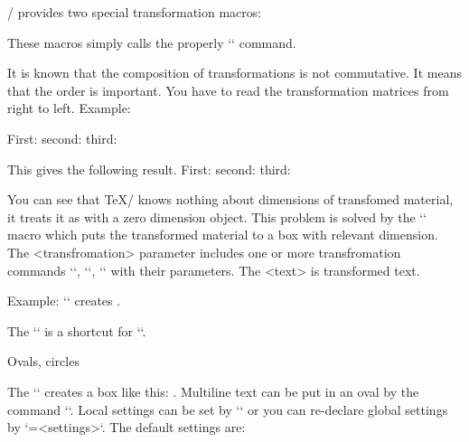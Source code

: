 {\OpTeX/ provides two special transformation macros:

\begtt
{} 
\endtt 

These macros simply calls the properly `\pdfsetmatrix` command.

It is known that the composition of transformations is not commutative. It
means that the order is important. You have to read the transformation
matrices from right to left. Example:

\begtt
First: \pdfsave {}\pdfrestore
second: \pdfsave {}\pdfrestore
third: \pdfsave {}%
       \pdfrestore %
\endtt
%
\par\nobreak\bigskip\smallskip
This gives the following result. 
First: \pdfsave {}\pdfrestore
second: \pdfsave {}\pdfrestore
third: \pdfsave {}\pdfrestore
\par\nobreak\bigskip{}%

You can see that \TeX/ knows nothing about dimensions of transfomed material,
it treats it as with a zero dimension object. 
\new
This problem is solved by the `` 
macro which puts the transformed
material to a box with relevant dimension. The <transfromation> parameter
includes one or more transfromation commands `\pdfsetmatrix`, `\pdfscale`,
`\pdfrotate` with their parameters. The <text> is transformed text.

Example: ``
creates .

The `` is a shortcut for 
``.

\secc Ovals, circles

\new
The `` creates a box like this: . 
Multiline text can be put in an oval by the command ``.
Local settings can be set by
`` or you can re-declare global settings by
`\ovalparams={<settings>}`. The default settings are:

}
